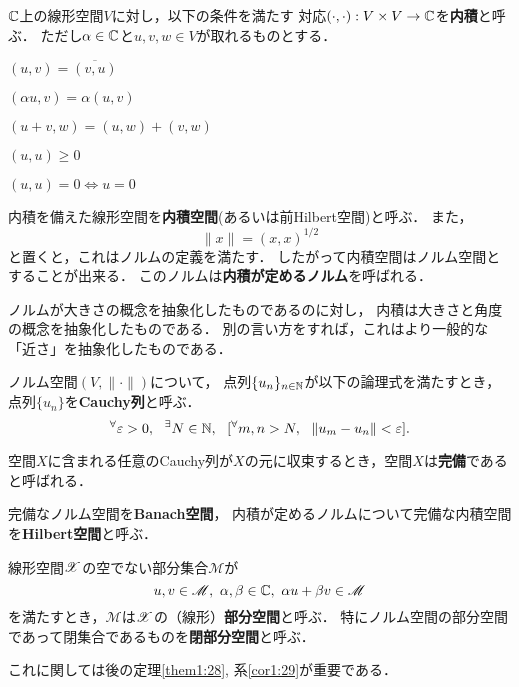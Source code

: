         \begin{Def}
            $\mathbb{C}$上の線形空間$V$に対し，以下の条件を満たす
            対応$(\cdot, \cdot): V \times V \to \mathbb{C} $を\textbf{内積}と呼ぶ．
            ただし$\alpha \in \mathbb{C}$と$u, v, w \in V$が取れるものとする．
            \begin{description}
                \setlength{\leftskip}{0.5truecm}
                \item[I1] $(u,v)=\overline{(v,u)}$
                \item[I2] $(\alpha u, v) =\alpha (u,v)$
                \item[I4] $(u+v,w)=(u,w)+(v,w)$
                \item[I5] $(u,u) \geq 0$
                \item[I6] $(u,u)=0 \iff u=0$
            \end{description}
            内積を備えた線形空間を\textbf{内積空間}(あるいは前Hilbert空間)と呼ぶ．
            また，\[ \|x\|=(x,x)^{1/2} \]と置くと，これはノルムの定義を満たす．
            したがって内積空間はノルム空間とすることが出来る．
            このノルムは\textbf{内積が定めるノルム}を呼ばれる．
        \end{Def}
        ノルムが大きさの概念を抽象化したものであるのに対し，
        内積は大きさと角度の概念を抽象化したものである．
        別の言い方をすれば，これはより一般的な「近さ」を抽象化したものである．

        \begin{Def}
            ノルム空間$(V, \| \cdot \|)$について，
            点列$\{ u_n \}_{n \in \mathbb{N}}$が以下の論理式を満たすとき，
            点列$\{ u_n \}$を\textbf{Cauchy列}と呼ぶ．
            \[ {}^{\forall} \varepsilon>0,~~ {}^{\exists} N \in \mathbb{N},~~ [ {}^{\forall} m,n>N,~~ \| u_m-u_n \|<\varepsilon ]. \]
        \end{Def}

        \begin{Def}
            空間$X$に含まれる任意のCauchy列が$X$の元に収束するとき，空間$X$は\textbf{完備}であると呼ばれる．
        \end{Def}

        \begin{Def}
            完備なノルム空間を\textbf{Banach空間}，
            内積が定めるノルムについて完備な内積空間を\textbf{Hilbert空間}と呼ぶ．
        \end{Def}

        \begin{Def}
            線形空間$\mathscr{X}$の空でない部分集合$\mathscr{M}$が
            \[ u, v \in \mathscr{M},~ \alpha, \beta \in \mathbb{C},~ \alpha u+ \beta v \in \mathscr{M} \]
            を満たすとき，$\mathscr{M}$は$\mathscr{X}$の（線形）\textbf{部分空間}と呼ぶ．
            特にノルム空間の部分空間であって閉集合であるものを\textbf{閉部分空間}と呼ぶ．
        \end{Def}
        これに関しては後の定理\ref{them1:28}, 系\ref{cor1:29}が重要である．


